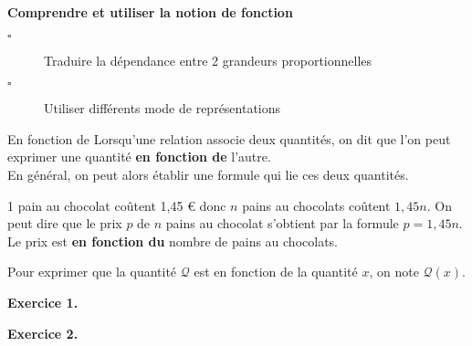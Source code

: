 \begin{titre}

\end{titre}



\begin{CpsCol}
\textbf{Comprendre et utiliser la notion de fonction}
\begin{description}
\item[$\square$] Traduire la dépendance entre 2 grandeurs proportionnelles
\item[$\square$] Utiliser différents mode de représentations
\end{description}
\end{CpsCol}



\begin{DefT}{En fonction de}
Lorsqu'une relation associe deux quantités, on dit que l'on peut exprimer une quantité \textbf{en fonction de} l'autre. \\ En général, on peut alors établir une formule qui lie ces deux quantités.
\end{DefT}

\begin{Ex}
1 pain au chocolat coûtent 1,45 \euro{} donc $n$ pains au chocolats coûtent $1,45n$. On peut dire que le prix $p$ de $n$ pains au chocolat s'obtient par la formule $p=1,45n$. Le prix est \textbf{en fonction du} nombre de pains au chocolats.
\end{Ex}


\begin{Nt}
Pour exprimer que la quantité $\mathscr{Q}$ est en fonction de la quantité $x$, on note $\mathscr{Q}(x)$.
\end{Nt}


 




 





\begin{autotest}
\textbf{Exercice 1.} 

\textbf{Exercice 2.} 
\end{autotest}
